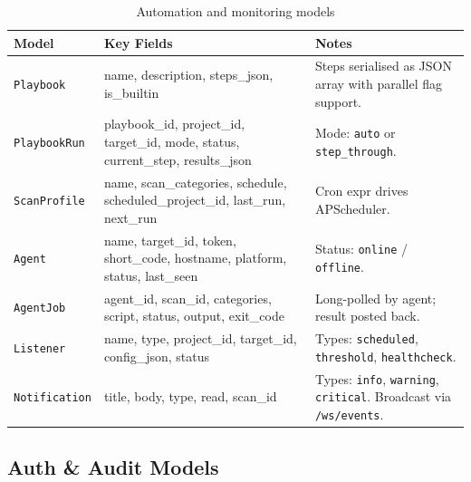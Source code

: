 \documentclass[11pt,a4paper,twoside,openright]{book}
\begin{document}
\begin{table}[H]
\centering
\begin{tabularx}{\textwidth}{L{3cm} L{4.5cm} X}
\toprule
\textbf{Model} & \textbf{Key Fields} & \textbf{Notes} \\
\midrule
\texttt{Playbook}    & name, description, steps\_json, is\_builtin & Steps serialised as JSON array with parallel flag support. \\
\texttt{PlaybookRun} & playbook\_id, project\_id, target\_id, mode, status, current\_step, results\_json & Mode: \texttt{auto} or \texttt{step\_through}. \\
\texttt{ScanProfile} & name, scan\_categories, schedule, scheduled\_project\_id, last\_run, next\_run & Cron expr drives APScheduler. \\
\texttt{Agent}       & name, target\_id, token, short\_code, hostname, platform, status, last\_seen & Status: \texttt{online} / \texttt{offline}. \\
\texttt{AgentJob}    & agent\_id, scan\_id, categories, script, status, output, exit\_code & Long-polled by agent; result posted back. \\
\texttt{Listener}    & name, type, project\_id, target\_id, config\_json, status & Types: \texttt{scheduled}, \texttt{threshold}, \texttt{healthcheck}. \\
\texttt{Notification}& title, body, type, read, scan\_id & Types: \texttt{info}, \texttt{warning}, \texttt{critical}. Broadcast via \texttt{/ws/events}. \\
\bottomrule
\end{tabularx}
\caption{Automation and monitoring models}
\end{table}

\subsection{Auth \& Audit Models}
\end{document}
